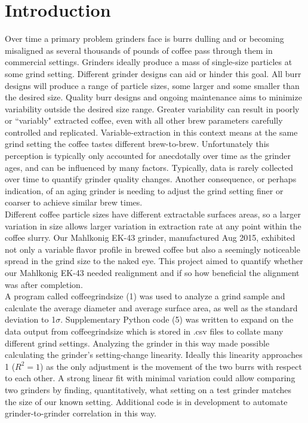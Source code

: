 \documentclass[10pt,a4paper,twocolumn,notitlepage]{article}
\begin{document}
\section{Introduction}
Over time a primary problem grinders face is burrs dulling and or becoming misaligned as several thousands of pounds of coffee pass through them in commercial settings. Grinders ideally produce a mass of single-size particles at some grind setting. Different grinder designs can aid or hinder this goal. All burr designs will produce a range of particle sizes, some larger and some smaller than the desired size. Quality burr designs and ongoing maintenance aims to minimize variability outside the desired size range. Greater variability can result in poorly or ``variably" extracted coffee, even with all other brew parameters carefully controlled and replicated. Variable-extraction in this context means at the same grind setting the coffee tastes different brew-to-brew. Unfortunately this perception is typically only accounted for anecdotally over time as the grinder ages, and can be influenced by many factors. Typically, data is rarely collected over time to quantify grinder quality changes. Another consequence, or perhaps indication, of an aging grinder is needing to adjust the grind setting finer or coarser to achieve similar brew times.\\

Different coffee particle sizes have different extractable surfaces areas, so a larger variation in size allows larger variation in extraction rate at any point within the coffee slurry. Our Mahlkonig EK-43 grinder, manufactured Aug 2015, exhibited not only a variable flavor profile in brewed coffee but also a seemingly noticeable spread in the grind size to the naked eye. This project aimed to quantify whether our Mahlkonig EK-43 needed realignment and if so how beneficial the alignment was after completion. \\

A program called coffeegrindsize (1) was used to analyze a grind sample and calculate the average diameter and average surface area, as well as the standard deviation to 1$\sigma$. Supplementary Python code (5) was written to expand on the data output from coffeegrindsize which is stored in .csv files to collate many different grind settings. Analyzing the grinder in this way made possible calculating the grinder's setting-change linearity. Ideally this linearity approaches 1 ($R^2=1$) as the only adjustment is the movement of the two burrs with respect to each other. A strong linear fit with minimal variation could allow comparing two grinders by finding, quantitatively, what setting on a test grinder matches the size of our known setting. Additional code is in development to automate grinder-to-grinder correlation in this way. 
\end{document}
